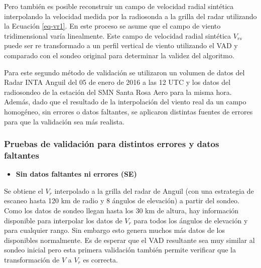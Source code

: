 \documentclass[12pt,spanish,oneside, a4paper]{book}
\providecommand{\tightlist}{%
  \setlength{\itemsep}{0pt}\setlength{\parskip}{0pt}}
\begin{document}
Pero también es posible reconstruir un campo de velocidad radial
sintética interpolando la velocidad medida por la radiosonda a la grilla
del radar utilizando la Ecuación \ref{eq-vr1}. En este proceso se asume
que el campo de viento tridimensional varía linealmente. Este campo de
velocidad radial sintética \(V_{rs}\) puede ser re transformado a un
perfil vertical de viento utilizando el VAD y comparado con el sondeo
original para determinar la validez del algoritmo.

Para este segundo método de validación se utilizaron un volumen de datos
del Radar INTA Anguil del 05 de enero de 2016 a las 12 UTC y los datos
del radiosondeo de la estación del SMN Santa Rosa Aero para la misma
hora. Además, dado que el resultado de la interpolación del viento real
da un campo homogéneo, sin errores o datos faltantes, se aplicaron
distintas fuentes de errores para que la validación sea más realista.

\subsubsection{Pruebas de validación para distintos errores y datos
faltantes}\label{pruebas-de-validacion-para-distintos-errores-y-datos-faltantes}

\begin{itemize}
\tightlist
\item
  \textbf{Sin datos faltantes ni errores (SE)}
\end{itemize}

Se obtiene el \(V_r\) interpolado a la grilla del radar de Anguil (con
una estrategia de escaneo hasta 120 km de radio y 8 ángulos de
elevación) a partir del sondeo. Como los datos de sondeo llegan hasta
los 30 km de altura, hay información disponible para interpolar los
datos de \(V_r\) para todos los ángulos de elevación y para cualquier
rango. Sin embargo esto genera muchos más datos de los disponibles
normalmente. Es de esperar que el VAD resultante sea muy similar al
sondeo inicial pero esta primera validación también permite verificar
que la transformación de \(V\) a \(V_r\) es correcta.
\end{document}
